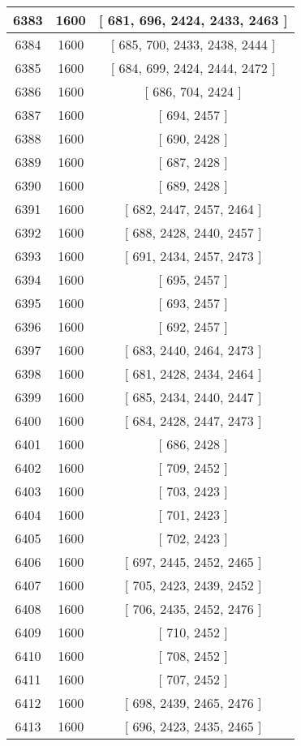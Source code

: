 \begin{center}
\begin{longtable}[H]{|| c c c ||}
\hline
6383 & 1600 & [ 681, 696, 2424, 2433, 2463 ] \\ 
\hline
6384 & 1600 & [ 685, 700, 2433, 2438, 2444 ] \\ 
\hline
6385 & 1600 & [ 684, 699, 2424, 2444, 2472 ] \\ 
\hline
6386 & 1600 & [ 686, 704, 2424 ] \\ 
\hline
6387 & 1600 & [ 694, 2457 ] \\ 
\hline
6388 & 1600 & [ 690, 2428 ] \\ 
\hline
6389 & 1600 & [ 687, 2428 ] \\ 
\hline
6390 & 1600 & [ 689, 2428 ] \\ 
\hline
6391 & 1600 & [ 682, 2447, 2457, 2464 ] \\ 
\hline
6392 & 1600 & [ 688, 2428, 2440, 2457 ] \\ 
\hline
6393 & 1600 & [ 691, 2434, 2457, 2473 ] \\ 
\hline
6394 & 1600 & [ 695, 2457 ] \\ 
\hline
6395 & 1600 & [ 693, 2457 ] \\ 
\hline
6396 & 1600 & [ 692, 2457 ] \\ 
\hline
6397 & 1600 & [ 683, 2440, 2464, 2473 ] \\ 
\hline
6398 & 1600 & [ 681, 2428, 2434, 2464 ] \\ 
\hline
6399 & 1600 & [ 685, 2434, 2440, 2447 ] \\ 
\hline
6400 & 1600 & [ 684, 2428, 2447, 2473 ] \\ 
\hline
6401 & 1600 & [ 686, 2428 ] \\ 
\hline
6402 & 1600 & [ 709, 2452 ] \\ 
\hline
6403 & 1600 & [ 703, 2423 ] \\ 
\hline
6404 & 1600 & [ 701, 2423 ] \\ 
\hline
6405 & 1600 & [ 702, 2423 ] \\ 
\hline
6406 & 1600 & [ 697, 2445, 2452, 2465 ] \\ 
\hline
6407 & 1600 & [ 705, 2423, 2439, 2452 ] \\ 
\hline
6408 & 1600 & [ 706, 2435, 2452, 2476 ] \\ 
\hline
6409 & 1600 & [ 710, 2452 ] \\ 
\hline
6410 & 1600 & [ 708, 2452 ] \\ 
\hline
6411 & 1600 & [ 707, 2452 ] \\ 
\hline
6412 & 1600 & [ 698, 2439, 2465, 2476 ] \\ 
\hline
6413 & 1600 & [ 696, 2423, 2435, 2465 ] \\ 

\end{longtable}
\end{center}
